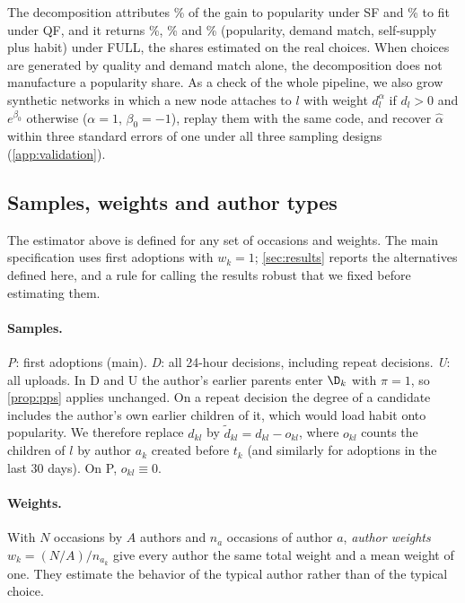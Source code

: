 The decomposition attributes \recSfPop\% of the gain to popularity under SF and \recQfFit\% to fit under QF, and it
returns \recFullPop\%, \recFullMatch\% and \recFullInertia\% (popularity, demand match, self-supply plus habit) under
FULL, the shares estimated on the real choices. When choices are generated by quality and demand match
alone, the decomposition does not manufacture a popularity share. As a check of the whole pipeline, we also grow
synthetic networks in which a new node attaches to $l$ with weight $d_l^{\alpha}$ if $d_l > 0$ and $e^{\beta_0}$
otherwise ($\alpha = 1$, $\beta_0 = -1$), replay them with the same code, and recover $\hat\alpha$ within three
standard errors of one under all three sampling designs (\cref{app:validation}).

\subsection{Samples, weights and author types}
\label{sec:samples}

The estimator above is defined for any set of occasions and weights. The main specification uses first adoptions
with $w_k = 1$; \cref{sec:results} reports the alternatives defined here, and a rule for calling the results robust
that we fixed before estimating them.

\paragraph{Samples.} \emph{P}: first adoptions (main). \emph{D}: all 24-hour decisions, including repeat decisions.
\emph{U}: all uploads. In D and U the author's earlier parents enter $\D_k$ with $\pi = 1$, so \cref{prop:pps}
applies unchanged. On a repeat decision the degree of a candidate includes the author's own earlier children of it,
which would load habit onto popularity. We therefore replace $d_{kl}$ by $\tilde d_{kl} = d_{kl} - o_{kl}$, where
$o_{kl}$ counts the children of $l$ by author $a_k$ created before $t_k$ (and similarly for adoptions in the last 30
days). On P, $o_{kl} \equiv 0$.

\paragraph{Weights.} With $N$ occasions by $A$ authors and $n_a$ occasions of author $a$, \emph{author weights}
$w_k = (N/A)/n_{a_k}$ give every author the same total weight and a mean weight of one. They estimate the behavior of
the typical author rather than of the typical choice.

